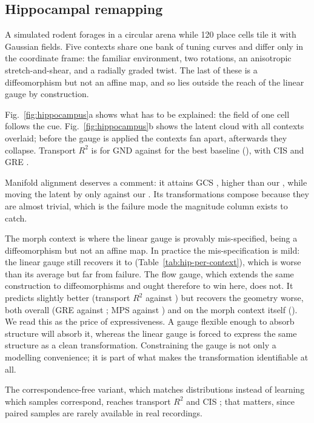 \documentclass{article}
\theoremstyle{plain}
\begin{document}
\subsection{Hippocampal remapping}
\label{sec:hippocampus}

A simulated rodent forages in a circular arena while 120 place cells tile it with
Gaussian fields. Five contexts share one bank of tuning curves and differ only in
the coordinate frame: the familiar environment, two rotations, an anisotropic
stretch-and-shear, and a radially graded twist. The last of these is a
diffeomorphism but not an affine map, and so lies outside the reach of the linear
gauge by construction.

Fig.~\ref{fig:hippocampus}a shows what has to be explained: the field of one cell
follows the cue. Fig.~\ref{fig:hippocampus}b shows the latent cloud with all
contexts overlaid; before the gauge is applied the contexts fan apart, afterwards
they collapse. Transport $R^2$ is
\hipGNDtransport{} for GND against \hipBestBaseTransport{} for the best baseline
(\hipBestBaseName), with CIS \hipGNDcis{} and GRE \hipGNDgre.

Manifold alignment deserves a comment: it attains GCS \hipMAgcs, higher than our
\hipGNDgcs, while moving the latent by only \hipMAmag{} against our \hipGNDmag.
Its transformations compose because they are almost trivial, which is the failure
mode the magnitude column exists to catch.

The morph context is where the linear gauge is provably mis-specified, being a
diffeomorphism but not an affine map. In practice the mis-specification is mild:
the linear gauge still recovers it to \hipGNDmorph{}
(Table~\ref{tab:hip-per-context}), which is worse than its \hipGNDgre{} average
but far from failure. The flow gauge, which extends the same construction to
diffeomorphisms and ought therefore to win here, does not. It predicts slightly
better (transport $R^2$ \hipFlowTransport{} against \hipGNDtransport) but
recovers the geometry worse, both overall (GRE \hipFlowGre{} against
\hipGNDgre; MPS \hipFlowMps{} against \hipGNDmps) and on the morph context
itself (\hipFlowMorph). We read this as the price of expressiveness. A gauge
flexible enough to absorb structure will absorb it, whereas the linear gauge is
forced to express the same structure as a clean transformation. Constraining the
gauge is not only a modelling convenience; it is part of what makes the
transformation identifiable at all.

The correspondence-free variant, which matches distributions instead of learning
which samples correspond, reaches transport $R^2$ \hipUnpairedTransport{} and CIS
\hipUnpairedCis; that matters, since paired samples are rarely available in real
recordings.
\end{document}
